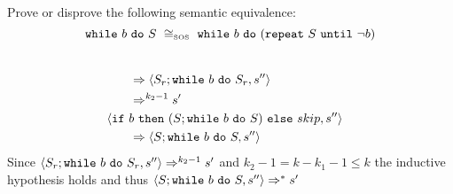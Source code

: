 \begin{exercise}{
    Prove or disprove the following semantic equivalence:
    \[ \wwhile{b}{S}\ \cong_{\text{\tiny SOS}}\ \wwhile{b}{(\wrepeat{S}{\neg b})}  \]
}
\begin{itemize}
\begin{itemize}
\begin{itemize}
\begin{itemize}
\begin{align*}
                                    \\&\qquad\Rightarrow \left<S_r; \texttt{while}\ b\ \texttt{do}\ S_r, s''\right>
                                    \\&\qquad\Rightarrow^{k_2 - 1} s'
                                    \\
                                    &\left<\texttt{if}\ b\ \texttt{then}\ (S; \texttt{while}\ b\ \texttt{do}\ S)\ \texttt{else}\ skip, s''\right>
                                    \\&\qquad\Rightarrow \left<S; \texttt{while}\ b\ \texttt{do}\ S, s''\right>
                                \end{align*}
                                Since $\left<S_r; \texttt{while}\ b\ \texttt{do}\ S_r, s''\right> \Rightarrow^{k_2 - 1} s'$ and $k_2 - 1 = k - k_1 - 1 \leq k$ the inductive hypothesis holds and thus $\left<S; \texttt{while}\ b\ \texttt{do}\ S, s''\right> \Rightarrow^* s'$
                        \end{itemize}
                    \end{itemize}
            \end{itemize}
    \end{itemize}
\end{exercise}
